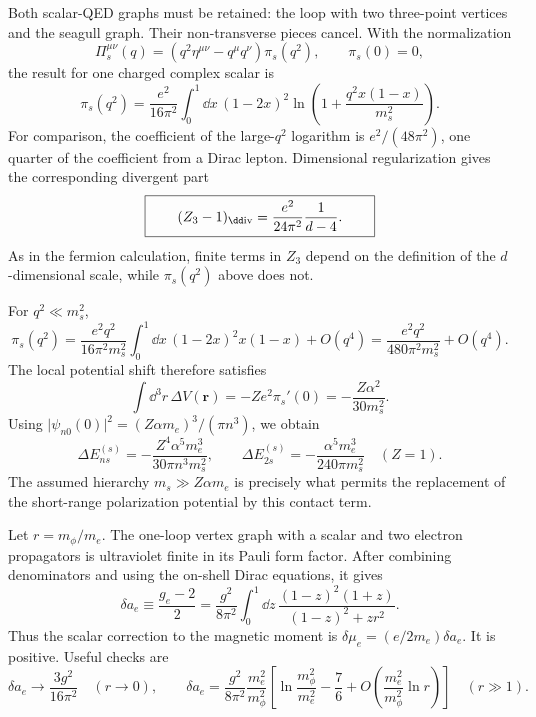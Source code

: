 \ExerciseEditorialNote

\begin{enumerate}
Both scalar-QED graphs must be retained: the loop with two three-point
vertices and the seagull graph.  Their non-transverse pieces cancel.  With
the normalization
\[
 \Pi_s^{\mu\nu}(q)
 =(q^2\eta^{\mu\nu}-q^\mu q^\nu)\pi_s(q^2),
 \qquad \pi_s(0)=0,
\]
the result for one charged complex scalar is
\[
 \boxed{\;
 \pi_s(q^2)=\frac{e^2}{16\pi^2}
 \int_0^1\dd x\,(1-2x)^2
 \ln\left(1+\frac{q^2x(1-x)}{m_s^2}\right) .
 \;}
\]
For comparison, the coefficient of the large-\(q^2\) logarithm is
\(e^2/(48\pi^2)\), one quarter of the coefficient from a Dirac lepton.
Dimensional regularization gives the corresponding divergent part
\[
 \boxed{\qquad
 (Z_3-1)_{\rm \dd iv}
 =\frac{e^2}{24\pi^2}\frac{1}{d-4}.
 \qquad}
\]
As in the fermion calculation, finite terms in \(Z_3\) depend on the
definition of the \(d\)-dimensional scale, while \(\pi_s(q^2)\) above does
not.

For \(q^2\ll m_s^2\),
\[
 \pi_s(q^2)
 =\frac{e^2q^2}{16\pi^2m_s^2}
 \int_0^1\dd x\,(1-2x)^2x(1-x)+O(q^4)
 =\frac{e^2q^2}{480\pi^2m_s^2}+O(q^4).
\]
The local potential shift therefore satisfies
\[
 \int \dd^3r\,\Delta V(\mathbf r)
 =-Ze^2\pi_s'(0)=-\frac{Z\alpha^2}{30m_s^2}.
\]
Using
\(\lvert\psi_{n0}(0)\rvert^2=(Z\alpha m_e)^3/(\pi n^3)\), we obtain
\[
 \boxed{\;
 \Delta E_{n s}^{(s)}
 =-\frac{Z^4\alpha^5m_e^3}{30\pi n^3m_s^2},
 \qquad
 \Delta E_{2s}^{(s)}
 =-\frac{\alpha^5m_e^3}{240\pi m_s^2}\quad(Z=1).
 \;}
\]
The assumed hierarchy \(m_s\gg Z\alpha m_e\) is precisely what permits the
replacement of the short-range polarization potential by this contact term.

Let \(r=m_\phi/m_e\).  The one-loop vertex graph with a scalar and two
electron propagators is ultraviolet finite in its Pauli form factor.  After
combining denominators and using the on-shell Dirac equations, it gives
\[
 \boxed{\;
 \delta a_e\equiv\frac{g_e-2}{2}
 =\frac{g^2}{8\pi^2}\int_0^1\dd z\,
 \frac{(1-z)^2(1+z)}
 {(1-z)^2+zr^2}.
 \;}
\]
Thus the scalar correction to the magnetic moment is
\(\delta\mu_e=(e/2m_e)\delta a_e\).  It is positive.  Useful checks are
\[
 \delta a_e\longrightarrow\frac{3g^2}{16\pi^2}
 \quad(r\to0),
 \qquad
 \delta a_e=\frac{g^2}{8\pi^2}\frac{m_e^2}{m_\phi^2}
 \left[\ln\frac{m_\phi^2}{m_e^2}-\frac76
+O\left(\frac{m_e^2}{m_\phi^2}\ln r\right)\right]
 \quad(r\gg1).
\]


\end{enumerate}
